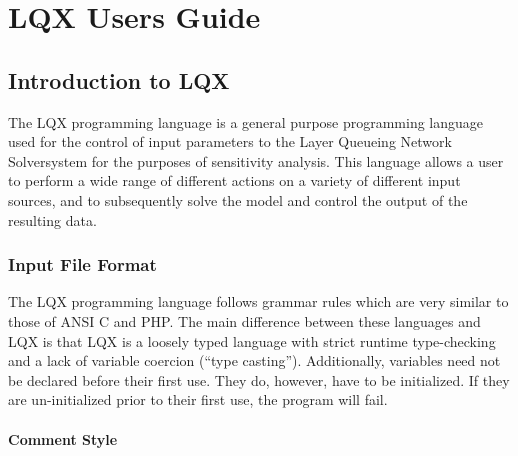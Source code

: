 \newcommand{\ModLang}{LQX }
\newcommand{\lqns}{Layer Queueing Network Solver}
\newcommand{\oper}[1]{\texttt{#1}\index{#1@\texttt{#1}}}
\newcommand{\opex}[1]{\texttt{#1}\index{"#1@\texttt{"#1}}}


\chapter{\ModLang Users Guide}
\section{Introduction to \ModLang}

The \ModLang programming language is a general purpose programming
language used for the control of input parameters to the \lqns system
for the purposes of sensitivity analysis. This language allows a user to
perform a wide range of different actions on a variety of different input
sources, and to subsequently solve the model and control the output of
the resulting data.

\subsection{Input File Format}

The \ModLang programming language follows grammar rules which are very
similar to those of ANSI C and PHP. The main difference between these
languages and \ModLang is that \ModLang is a loosely typed language with
strict runtime type-checking and a lack of variable coercion
(``type casting''). Additionally, variables need not be declared before
their first use. They do, however, have to be initialized. If they
are un-initialized prior to their first use, the program will fail.

\subsubsection{Comment Style}

